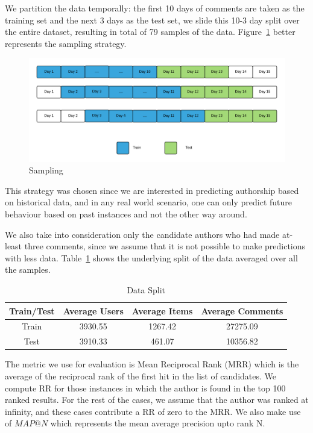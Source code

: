 We partition the data temporally: the first 10 days of comments are taken as the training set and the next 3 days as the test set, we slide this 10-3 day split over the entire dataset, resulting in total of 79 samples of the data. Figure~\ref{fig:inv_2} better represents the sampling strategy.

\begin{figure}[!h]
\centering
\includegraphics[width=1\textwidth]{c-inv_images/inv_2.png}
\caption{Sampling}
\label{fig:inv_2}
\end{figure}

This strategy was chosen since we are interested in predicting authorship based on historical data, and in any real world scenario, one can only predict future behaviour based on past instances and not the other way around. 

We also take into consideration only the candidate authors who had made at-least three comments, since we assume that it is not possible to make predictions with less data. Table~\ref{tab:split} shows the underlying split of the data averaged over all the samples.

\begin{table}[!h]
\centering
\begin{tabular}{|c|c|c|c|}
\hline
 \textbf{Train/Test} & \textbf{Average Users} & \textbf{Average Items} & \textbf{Average Comments} \\ \hline
 Train & 3930.55 & 1267.42 & 27275.09 \\ \hline
 Test & 3910.33 & 461.07 & 10356.82 \\ \hline
\end{tabular}
\caption{Data Split}
\label{tab:split}
\end{table}

The metric we use for evaluation is Mean Reciprocal Rank (MRR) which is %
the average of the reciprocal rank of the first hit in the list of candidates. We compute RR for those instances in which the author is found in the top 100 ranked results. For the rest of the cases, we assume that the author was ranked at infinity, and these cases contribute a RR of zero to the MRR. We also make use of $MAP@N$ which represents the mean average precision upto rank N.

